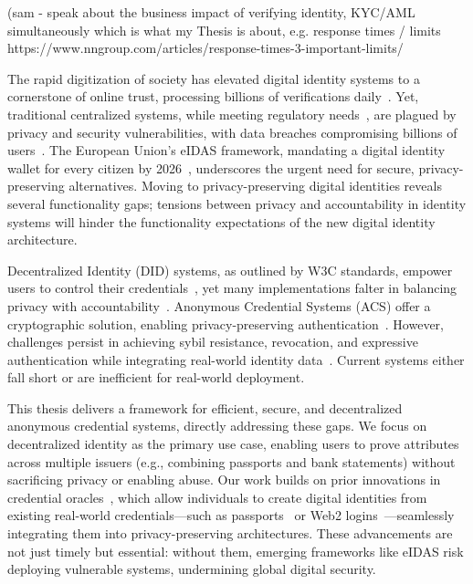 















(sam - speak about the business impact of verifying identity, KYC/AML simultaneously which is what my Thesis is about, e.g. response times / limits https://www.nngroup.com/articles/response-times-3-important-limits/ 



The rapid digitization of society has elevated digital identity systems to a cornerstone of online trust, processing billions of verifications daily~\cite{noauthor_happy_2021, pang_zanzibar_2019}. Yet, traditional centralized systems, while meeting regulatory needs~\cite{eltayeb_crucial_2024}, are plagued by privacy and security vulnerabilities, with data breaches compromising billions of users~\cite{zhang_data_2022}. The European Union’s eIDAS framework, mandating a digital identity wallet for every citizen by 2026~\cite{noauthor_regulation_2024}, underscores the urgent need for secure, privacy-preserving alternatives. Moving to privacy-preserving digital identities reveals several functionality gaps; tensions between privacy and accountability in identity systems will hinder the functionality expectations of the new digital identity architecture. 

Decentralized Identity (DID) systems, as outlined by W3C standards, empower users to control their credentials~\cite{soltani_survey_2021}, yet many implementations falter in balancing privacy with accountability~\cite{maram_candid_2020}. Anonymous Credential Systems (ACS) offer a cryptographic solution, enabling privacy-preserving authentication~\cite{chaum_untraceable_1981, hutchison_signature_2004, dunkelman_formal_2016, security_team_computer_science_dept_ibm_zurich_cryptographic_2010}. However, challenges persist in achieving sybil resistance, revocation, and expressive authentication while integrating real-world identity data~\cite{crites_syra_2024, rosenberg_zk-creds_2022}. Current systems either fall short or are inefficient for real-world deployment. 

This thesis delivers a framework for efficient, secure, and decentralized anonymous credential systems, directly addressing these gaps. We focus on decentralized identity as the primary use case, enabling users to prove attributes across multiple issuers (e.g., combining passports and bank statements) without sacrificing privacy or enabling abuse. Our work builds on prior innovations in credential oracles~\cite{zhang_deco_2020}, which allow individuals to create digital identities from existing real-world credentials—such as passports~\cite{rosenberg_zk-creds_2022} or Web2 logins~\cite{baldimtsi_zklogin_2024}—seamlessly integrating them into privacy-preserving architectures. These advancements are not just timely but essential: without them, emerging frameworks like eIDAS risk deploying vulnerable systems, undermining global digital security.

